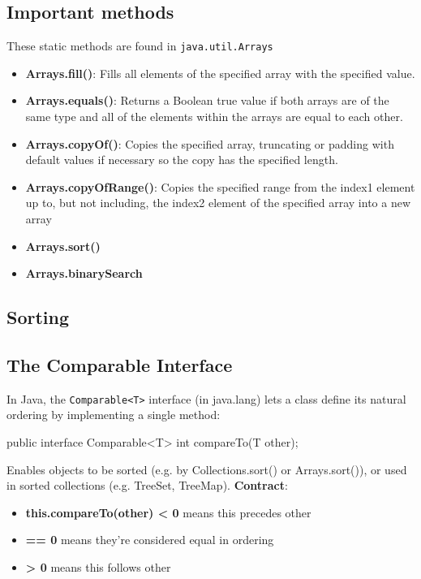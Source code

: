 \documentclass{report}
\begin{document}
    \subsection{Important methods}
    \bigbreak \noindent 
    These static methods are found in \texttt{java.util.Arrays}
    \bigbreak \noindent 
    \begin{itemize}
        \item \textbf{Arrays.fill()}: Fills all elements of the specified array with the specified value.
        \item \textbf{Arrays.equals()}: Returns a Boolean true value if both arrays are of the same type and all of the elements within the arrays are equal to each other. 
        \item \textbf{Arrays.copyOf()}: Copies the specified array, truncating or padding with default values if necessary so the copy has the specified length.
        \item \textbf{Arrays.copyOfRange()}: Copies the specified range from the index1 element up to, but not including, the index2 element of the specified array into a new array
        \item \textbf{Arrays.sort()}
        \item \textbf{Arrays.binarySearch}
    \end{itemize}

    \bigbreak \noindent 
    \subsection{Sorting}
    \bigbreak \noindent 
    \subsection{The Comparable Interface}
    \bigbreak \noindent 
    In Java, the \texttt{Comparable<T>} interface (in java.lang) lets a class define its natural ordering by implementing a single method:
    \bigbreak \noindent 
    \begin{javacode}
    public interface Comparable<T> {
        int compareTo(T other);
    }
    \end{javacode}
    \bigbreak \noindent 
    Enables objects to be sorted (e.g. by Collections.sort() or Arrays.sort()), or used in sorted collections (e.g. TreeSet, TreeMap).
    \bigbreak \noindent 
    \textbf{Contract}:
    \begin{itemize}
        \item \textbf{this.compareTo(other) < 0} means this precedes other
        \item \textbf{== 0} means they’re considered equal in ordering
        \item \textbf{> 0} means this follows other
    \end{itemize}
\end{document}
